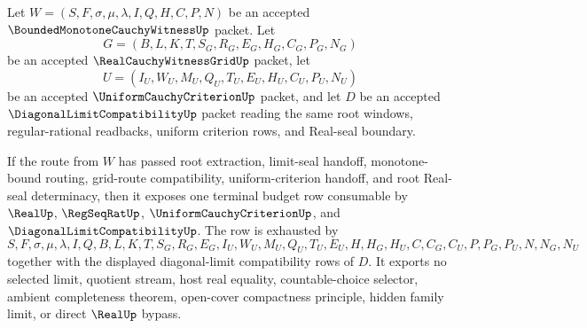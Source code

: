 \begin{theorem}
\label{thm:bounded-monotone-cauchy-witness-terminal-budget-extraction}
Let $W=(S,F,\sigma,\mu,\lambda,I,Q,H,C,P,N)$ be an accepted $\BoundedMonotoneCauchyWitnessUp$ packet. Let
$$
G=(B,L,K,T,S_G,R_G,E_G,H_G,C_G,P_G,N_G)
$$
be an accepted $\RealCauchyWitnessGridUp$ packet, let
$$
U=(I_U,W_U,M_U,Q_U,T_U,E_U,H_U,C_U,P_U,N_U)
$$
be an accepted $\UniformCauchyCriterionUp$ packet, and let $D$ be an accepted $\DiagonalLimitCompatibilityUp$ packet reading the same root windows, regular-rational readbacks, uniform criterion rows, and Real-seal boundary.

If the route from $W$ has passed root extraction, limit-seal handoff, monotone-bound routing, grid-route compatibility, uniform-criterion handoff, and root Real-seal determinacy, then it exposes one terminal budget row consumable by $\RealUp$, $\RegSeqRatUp$, $\UniformCauchyCriterionUp$, and $\DiagonalLimitCompatibilityUp$. The row is exhausted by
$$
S,F,\sigma,\mu,\lambda,I,Q,B,L,K,T,S_G,R_G,E_G,I_U,W_U,M_U,Q_U,T_U,E_U,H,H_G,H_U,C,C_G,C_U,P,P_G,P_U,N,N_G,N_U
$$
together with the displayed diagonal-limit compatibility rows of $D$. It exports no selected limit, quotient stream, host real equality, countable-choice selector, ambient completeness theorem, open-cover compactness principle, hidden family limit, or direct $\RealUp$ bypass.
\end{theorem}
